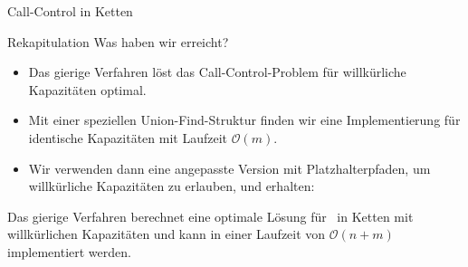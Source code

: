 \begin{section}{Call-Control in Ketten}
\begin{frame}{Rekapitulation}
	Was haben wir erreicht?
	\begin{itemize}
		\pause\item Das gierige Verfahren löst das Call-Control-Problem für willkürliche Kapazitäten optimal.
		\pause\item Mit einer speziellen Union-Find-Struktur finden wir eine Implementierung für identische Kapazitäten mit Laufzeit $\mathcal{O}(m)$.
		\pause\item Wir verwenden dann eine angepasste Version mit Platzhalterpfaden, um willkürliche Kapazitäten zu erlauben, und erhalten:
	\end{itemize}
	\pause\begin{theorem}
  		Das gierige Verfahren berechnet eine optimale Lösung für \CallControl\ in Ketten mit willkürlichen Kapazitäten und kann in einer Laufzeit von
		$\mathcal O(n+m)$ implementiert werden.
	\end{theorem}
\end{frame}

\end{section}